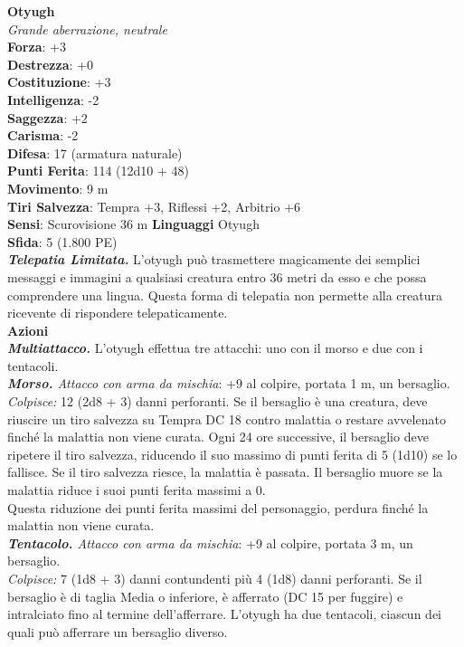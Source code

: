 \begin{multicols}{2}
\medskip\textbf{Otyugh}\\
\emph{Grande aberrazione, neutrale}\\
\textbf{Forza}: +3\\
\textbf{Destrezza}: +0\\
\textbf{Costituzione}: +3\\
\textbf{Intelligenza}: -2\\
\textbf{Saggezza}: +2\\
\textbf{Carisma}: -2\\
\textbf{Difesa}: 17 (armatura naturale)\\
\textbf{Punti Ferita}: 114 (12d10 + 48)\\
\textbf{Movimento}: 9 m\\
\textbf{Tiri Salvezza}: Tempra +3, Riflessi +2, Arbitrio +6\\
\textbf{Sensi}: Scurovisione 36 m
\textbf{Linguaggi} Otyugh\\
\textbf{Sfida}: 5 (1.800 PE)\smallskip\\
\emph{\textbf{Telepatia Limitata.}} L'otyugh può trasmettere magicamente dei semplici messaggi e immagini a qualsiasi creatura entro 36 metri da esso e che possa comprendere una lingua. Questa forma di telepatia non permette alla creatura ricevente di rispondere telepaticamente.\\
\smallskip\textbf{Azioni}\\
\emph{\textbf{Multiattacco.}} L'otyugh effettua tre attacchi: uno con il morso e due con i tentacoli.\\
\emph{\textbf{Morso.} Attacco con arma da mischia}: +9 al colpire, portata 1 m, un bersaglio.\\

\emph{Colpisce:} 12 (2d8 + 3) danni perforanti. Se il bersaglio è una creatura, deve riuscire un tiro salvezza su Tempra DC  18 contro malattia o restare avvelenato finché la malattia non viene curata. Ogni 24 ore successive, il bersaglio deve ripetere il tiro salvezza, riducendo il suo massimo di punti ferita di 5 (1d10) se lo fallisce. Se il tiro salvezza riesce, la malattia è passata. Il bersaglio muore se la malattia riduce i suoi punti ferita massimi a 0.\\
Questa riduzione dei punti ferita massimi del personaggio, perdura  finché la malattia non viene curata.\\
\emph{\textbf{Tentacolo.} Attacco con arma da mischia}: +9 al colpire, portata 3 m, un bersaglio.\\
\emph{Colpisce:} 7 (1d8 + 3) danni contundenti più 4 (1d8) danni perforanti. Se il bersaglio è di taglia Media o inferiore, è afferrato (DC  15 per fuggire) e intralciato fino al termine dell'afferrare. L'otyugh ha due tentacoli, ciascun dei quali può afferrare un bersaglio diverso.\\


\end{multicols}
